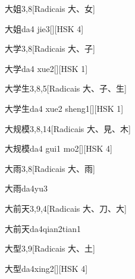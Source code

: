 \begin{entry}{大姐}{3,8}[Radicais ⼤、⼥]
  \begin{phonetics}{大姐}{da4 jie3}[][HSK 4]
  \end{phonetics}
\end{entry}

\begin{entry}{大学}{3,8}[Radicais ⼤、⼦]
  \begin{phonetics}{大学}{da4 xue2}[][HSK 1]
  \end{phonetics}
\end{entry}

\begin{entry}{大学生}{3,8,5}[Radicais ⼤、⼦、⽣]
  \begin{phonetics}{大学生}{da4 xue2 sheng1}[][HSK 1]
  \end{phonetics}
\end{entry}

\begin{entry}{大规模}{3,8,14}[Radicais ⼤、⾒、⽊]
  \begin{phonetics}{大规模}{da4 gui1 mo2}[][HSK 4]
  \end{phonetics}
\end{entry}

\begin{entry}{大雨}{3,8}[Radicais ⼤、⾬]
  \begin{phonetics}{大雨}{da4yu3}
  \end{phonetics}
\end{entry}

\begin{entry}{大前天}{3,9,4}[Radicais ⼤、⼑、⼤]
  \begin{phonetics}{大前天}{da4qian2tian1}
  \end{phonetics}
\end{entry}

\begin{entry}{大型}{3,9}[Radicais ⼤、⼟]
  \begin{phonetics}{大型}{da4xing2}[][HSK 4]
  \end{phonetics}
\end{entry}

